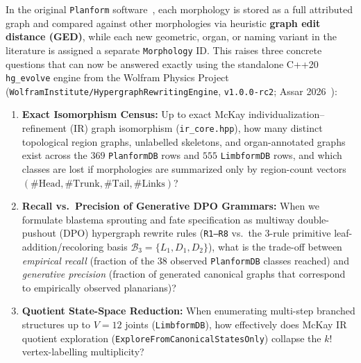 \documentclass[11pt,a4paper]{article}
\theoremstyle{definition}
\theoremstyle{remark}
\begin{document}
In the original \texttt{Planform} software~\cite{Lobo2013Planform}, each morphology is stored as a full attributed graph and compared against other morphologies via heuristic \textbf{graph edit distance (GED)}, while each new geometric, organ, or naming variant in the literature is assigned a separate \texttt{Morphology} ID. This raises three concrete questions that can now be answered exactly using the standalone C++20 \texttt{hg\_evolve} engine from the Wolfram Physics Project (\texttt{WolframInstitute/HypergraphRewritingEngine}, \texttt{v1.0.0-rc2}; Assar 2026~\cite{Assar2026,Wolfram2020}):
\begin{enumerate}
  \item \textbf{Exact Isomorphism Census:} Up to exact McKay individualization--refinement (IR) graph isomorphism (\texttt{ir\_core.hpp}), how many distinct topological region graphs, unlabelled skeletons, and organ-annotated graphs exist across the $369$ \texttt{PlanformDB} rows and $555$ \texttt{LimbformDB} rows, and which classes are lost if morphologies are summarized only by region-count vectors $(\#\text{Head}, \#\text{Trunk}, \#\text{Tail}, \#\text{Links})$?
  \item \textbf{Recall vs.\ Precision of Generative DPO Grammars:} When we formulate blastema sprouting and fate specification as multiway double-pushout (DPO) hypergraph rewrite rules (\texttt{R1--R8} vs.\ the 3-rule primitive leaf-addition/recoloring basis $\mathcal{B}_3 = \{L_1, D_1, D_2\}$), what is the trade-off between \emph{empirical recall} (fraction of the $38$ observed \texttt{PlanformDB} classes reached) and \emph{generative precision} (fraction of generated canonical graphs that correspond to empirically observed planarians)?
  \item \textbf{Quotient State-Space Reduction:} When enumerating multi-step branched structures up to $V = 12$ joints (\texttt{LimbformDB}), how effectively does McKay IR quotient exploration (\texttt{ExploreFromCanonicalStatesOnly}) collapse the $k!$ vertex-labelling multiplicity?
\end{enumerate}
\end{document}
